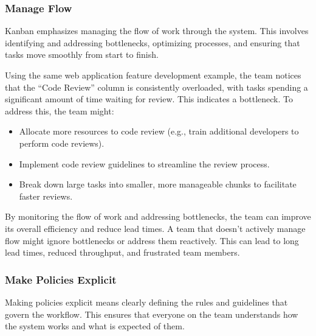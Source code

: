 \subsubsection{Manage Flow}

Kanban emphasizes managing the flow of work through the system. This involves
identifying and addressing bottlenecks, optimizing processes, and ensuring that
tasks move smoothly from start to finish.

\begin{examplecountercard}
  Using the same web application feature development example, the team notices that the ``Code Review'' column is consistently overloaded, with tasks spending a significant amount of time waiting for review. This indicates a bottleneck. To address this, the team might:

  \begin{itemize}
    \item Allocate more resources to code review (e.g., train additional developers to
          perform code reviews).
    \item Implement code review guidelines to streamline the review process.
    \item Break down large tasks into smaller, more manageable chunks to facilitate
          faster reviews.
  \end{itemize}

  By monitoring the flow of work and addressing bottlenecks, the team can improve
  its overall efficiency and reduce lead times. \tcblower A team that doesn't
  actively manage flow might ignore bottlenecks or address them reactively. This
  can lead to long lead times, reduced throughput, and frustrated team members.
\end{examplecountercard}

\subsubsection{Make Policies Explicit}

Making policies explicit means clearly defining the rules and guidelines that
govern the workflow. This ensures that everyone on the team understands how the
system works and what is expected of them.

